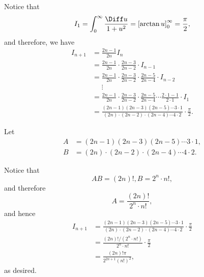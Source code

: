 \begin{enumerate}
          Notice that
          \[
              I_1 = \int_0^{\infty} \frac{\Diff u}{1 + u^2} = \left[\arctan u\right]^{\infty}_0 = \frac{\pi}{2},
          \]
          and therefore, we have
          \begin{align*}
              I_{n + 1} & = \frac{2n - 1}{2n} I_n                                                                                                      \\
                        & = \frac{2n - 1}{2n} \cdot \frac{2n - 3}{2n - 2} \cdot I_{n - 1}                                                              \\
                        & = \frac{2n - 1}{2n} \cdot \frac{2n - 3}{2n - 2} \cdot \frac{2n - 5}{2n - 4} \cdot I_{n - 2}                                  \\
                        & \phantom{=} \vdots                                                                                                           \\
                        & = \frac{2n - 1}{2n} \cdot \frac{2n - 3}{2n - 2} \cdot \frac{2n - 5}{2n - 4} \cdots \frac{2 \cdot 1 - 1}{2 \cdot 1} \cdot I_1 \\
                        & = \frac{(2n - 1)(2n - 3)(2n - 5) \cdots 3 \cdot 1}{(2n) \cdot (2n - 2) \cdot (2n - 4) \cdots 4 \cdot 2} \cdot \frac{\pi}{2}.
          \end{align*}

          Let
          \begin{align*}
              A & = (2n - 1)(2n - 3)(2n - 5) \cdots 3 \cdot 1,           \\
              B & = (2n) \cdot (2n - 2) \cdot (2n - 4) \cdots 4 \cdot 2.
          \end{align*}

          Notice that
          \[
              AB = (2n)!, B = 2^n \cdot n!,
          \]
          and therefore
          \[
              A = \frac{(2n)!}{2^n \cdot n!},
          \]
          and hence
          \begin{align*}
              I_{n + 1} & = \frac{(2n - 1)(2n - 3)(2n - 5) \cdots 3 \cdot 1}{(2n) \cdot (2n - 2) \cdot (2n - 4) \cdots 4 \cdot 2} \cdot \frac{\pi}{2} \\
                        & = \frac{(2n)! / (2^n \cdot n!)}{2^n \cdot n!} \cdot \frac{\pi}{2}                                                           \\
                        & = \frac{(2n)! \pi}{2^{2n + 1} (n!)^2},
          \end{align*}
          as desired.


\end{enumerate}
